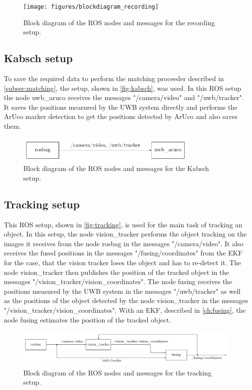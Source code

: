 \begin{figure}[ht!]\centering
	\texttt{[image: figures/blockdiagram\_recording]}
	\caption{Block diagram of the \ac{ROS} nodes and messages for the recording setup.}\label{fig:recording}
\end{figure}

\subsection{Kabsch setup}\label{subsec:kabsch}
To save the required data to perform the matching proceeder described in \autoref{subsec:matching}, the setup, shown in \autoref{fig:kabsch}, was used. In this \ac{ROS} setup the node uwb\_aruco receives the messages "/camera/video" and "/uwb/tracker". It saves the positions measured by the \ac{UWB} system directly and performs the ArUco marker detection to get the positions detected by ArUco and also saves them.

\begin{figure}[ht!]\centering
	\includegraphics[width=0.8\textwidth]{figures/blockdiagram_kabsch}
	\caption{Block diagram of the \ac{ROS} nodes and messages for the Kabsch setup.}\label{fig:kabsch}
\end{figure}

\subsection{Tracking setup}\label{subsec:tracking}
This \ac{ROS} setup, shown in \autoref{fig:tracking}, is used for the main task of tracking an object. In this setup, the node vision\_tracker performs the object tracking on the images it receives from the node rosbag in the messages "/camera/video". It also receives the fused positions in the messages "/fusing/coordinates" from the \ac{EKF} for the case, that the vision tracker loses the object and has to re-detect it. The node vision\_tracker then publishes the position of the tracked object in the messages "/vision\_tracker/vision\_coordinates". The node fusing receives the positions measured by the \ac{UWB} system in the messages "/uwb/tracker" as well as the positions of the object detected by the node vision\_tracker in the messages "/vision\_tracker/vision\_coordinates". With an \ac{EKF}, described in \autoref{ch:fusing}, the node fusing estimates the position of the tracked object.

\begin{figure}[ht!]\centering
	\includegraphics[width=1.0\textwidth]{figures/blockdiagram_tracking}
	\caption{Block diagram of the \ac{ROS} nodes and messages for the tracking setup.}\label{fig:tracking}
\end{figure}

